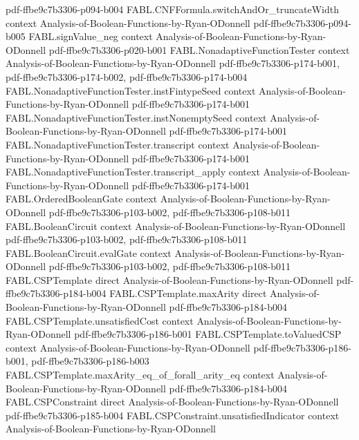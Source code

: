 \begin{theorem}
  {pdf-ffbe9c7b3306-p094-b004}
\proofstep
  {FABL.CNFFormula.switchAndOr_truncateWidth}
  {context}
  {Analysis-of-Boolean-Functions-by-Ryan-ODonnell}
  {pdf-ffbe9c7b3306-p094-b005}
\proofstep
  {FABL.signValue_neg}
  {context}
  {Analysis-of-Boolean-Functions-by-Ryan-ODonnell}
  {pdf-ffbe9c7b3306-p020-b001}
\proofstep
  {FABL.NonadaptiveFunctionTester}
  {context}
  {Analysis-of-Boolean-Functions-by-Ryan-ODonnell}
  {pdf-ffbe9c7b3306-p174-b001,
    pdf-ffbe9c7b3306-p174-b002,
    pdf-ffbe9c7b3306-p174-b004}
\proofstep
  {FABL.NonadaptiveFunctionTester.instFintypeSeed}
  {context}
  {Analysis-of-Boolean-Functions-by-Ryan-ODonnell}
  {pdf-ffbe9c7b3306-p174-b001}
\proofstep
  {FABL.NonadaptiveFunctionTester.instNonemptySeed}
  {context}
  {Analysis-of-Boolean-Functions-by-Ryan-ODonnell}
  {pdf-ffbe9c7b3306-p174-b001}
\proofstep
  {FABL.NonadaptiveFunctionTester.transcript}
  {context}
  {Analysis-of-Boolean-Functions-by-Ryan-ODonnell}
  {pdf-ffbe9c7b3306-p174-b001}
\proofstep
  {FABL.NonadaptiveFunctionTester.transcript_apply}
  {context}
  {Analysis-of-Boolean-Functions-by-Ryan-ODonnell}
  {pdf-ffbe9c7b3306-p174-b001}
\proofstep
  {FABL.OrderedBooleanGate}
  {context}
  {Analysis-of-Boolean-Functions-by-Ryan-ODonnell}
  {pdf-ffbe9c7b3306-p103-b002,
    pdf-ffbe9c7b3306-p108-b011}
\proofstep
  {FABL.BooleanCircuit}
  {context}
  {Analysis-of-Boolean-Functions-by-Ryan-ODonnell}
  {pdf-ffbe9c7b3306-p103-b002,
    pdf-ffbe9c7b3306-p108-b011}
\proofstep
  {FABL.BooleanCircuit.evalGate}
  {context}
  {Analysis-of-Boolean-Functions-by-Ryan-ODonnell}
  {pdf-ffbe9c7b3306-p103-b002,
    pdf-ffbe9c7b3306-p108-b011}
\proofstep
  {FABL.CSPTemplate}
  {direct}
  {Analysis-of-Boolean-Functions-by-Ryan-ODonnell}
  {pdf-ffbe9c7b3306-p184-b004}
\proofstep
  {FABL.CSPTemplate.maxArity}
  {direct}
  {Analysis-of-Boolean-Functions-by-Ryan-ODonnell}
  {pdf-ffbe9c7b3306-p184-b004}
\proofstep
  {FABL.CSPTemplate.unsatisfiedCost}
  {context}
  {Analysis-of-Boolean-Functions-by-Ryan-ODonnell}
  {pdf-ffbe9c7b3306-p186-b001}
\proofstep
  {FABL.CSPTemplate.toValuedCSP}
  {context}
  {Analysis-of-Boolean-Functions-by-Ryan-ODonnell}
  {pdf-ffbe9c7b3306-p186-b001,
    pdf-ffbe9c7b3306-p186-b003}
\proofstep
  {FABL.CSPTemplate.maxArity_eq_of_forall_arity_eq}
  {context}
  {Analysis-of-Boolean-Functions-by-Ryan-ODonnell}
  {pdf-ffbe9c7b3306-p184-b004}
\proofstep
  {FABL.CSPConstraint}
  {direct}
  {Analysis-of-Boolean-Functions-by-Ryan-ODonnell}
  {pdf-ffbe9c7b3306-p185-b004}
\proofstep
  {FABL.CSPConstraint.unsatisfiedIndicator}
  {context}
  {Analysis-of-Boolean-Functions-by-Ryan-ODonnell}

\end{theorem}
